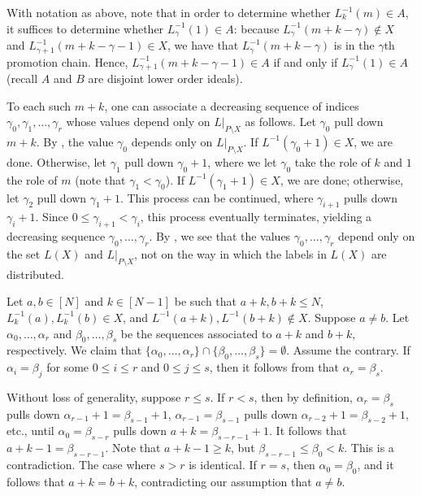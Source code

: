 \documentclass[11pt]{amsart}
\theoremstyle{definition}
\newcommand{\inverse}{^{-1}}
\begin{document}
With notation as above, note that in order to determine whether $ L_k\inverse(m)\in A $, it suffices to determine whether $ L_{\gamma}\inverse(1)\in A $: because $ L_{\gamma}\inverse(m+k-\gamma)\not\in X $ and $ L_{\gamma+1}\inverse(m+k-\gamma-1)\in X $, we have that $ L_{\gamma}\inverse(m+k-\gamma) $ is in the $ \gamma $th promotion chain. Hence, $ L_{\gamma+1}\inverse(m+k-\gamma-1)\in A $ if and only if $ L_{\gamma}\inverse(1)\in A $ (recall $ A $ and $ B $ are disjoint lower order ideals). 

To each such $ m+k $, one can associate a decreasing sequence of indices $ \gamma_0,\gamma_1,\ldots,\gamma_r $ whose values depend only on $ L|_{P\setminus X} $ as follows. Let $ \gamma_0 $ pull down $ m+k $. By , the value $ \gamma_0 $ depends only on $ L|_{P\setminus X} $. If $ L\inverse(\gamma_0+1)\in X $, we are done. Otherwise, let $ \gamma_1 $ pull down $ \gamma_0+1 $, where we let $ \gamma_0 $ take the role of $ k $ and $ 1 $ the role of $ m $ (note that $ \gamma_1<\gamma_0 $). If $ L\inverse(\gamma_1+1)\in X $, we are done; otherwise, let $ \gamma_2 $ pull down $ \gamma_1+1 $. This process can be continued, where $ \gamma_{i+1} $ pulls down $ \gamma_i+1 $. Since $ 0\leq\gamma_{i+1}<\gamma_i $, this process eventually terminates, yielding a decreasing sequence $ \gamma_0,\ldots,\gamma_r $. By , we see that the values $ \gamma_0,\ldots,\gamma_r $ depend only on the set $ L(X) $ and $ L|_{P\setminus X} $, not on the way in which the labels in $ L(X) $ are distributed. 

Let $ a,b\in[N] $ and $ k\in[N-1] $ be such that $ a+k,b+k\leq N $, $ L_k\inverse(a),L_k\inverse(b)\in X $, and $ L\inverse(a+k),L\inverse(b+k)\not\in X $. Suppose $ a\neq b $. Let $ \alpha_0,\ldots,\alpha_r $ and $ \beta_0,\ldots,\beta_s $ be the sequences associated to $ a+k $ and $ b+k $, respectively. We claim that $ \{\alpha_0,\ldots,\alpha_r\}\cap\{\beta_0,\ldots,\beta_s\}=\emptyset $. Assume the contrary. If $ \alpha_i=\beta_j $ for some $ 0\leq i\leq r $ and $ 0\leq j\leq s $, then it follows from  that $ \alpha_r=\beta_s $. 

Without loss of generality, suppose $ r\leq s $. If $ r<s $, then by definition, $ \alpha_r=\beta_s $ pulls down $ \alpha_{r-1}+1=\beta_{s-1}+1 $, $ \alpha_{r-1}=\beta_{s-1} $ pulls down $ \alpha_{r-2}+1=\beta_{s-2}+1 $, etc., until $ \alpha_0=\beta_{s-r} $ pulls down $ a+k=\beta_{s-r-1}+1 $. It follows that $ a+k-1=\beta_{s-r-1} $. Note that $ a+k-1\geq k $, but $ \beta_{s-r-1}\leq\beta_0<k $. This is a contradiction. The case where $ s>r $ is identical. If $ r=s $, then $ \alpha_0=\beta_0 $, and it follows that $ a+k=b+k $, contradicting our assumption that $ a\neq b $. 
\end{document}
